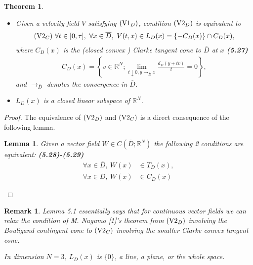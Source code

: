 \documentclass{book}
\numberwithin{equation}{section}
\newtheorem{lemma}{Lemma}[section]
\newtheorem{theorem}{Theorem}[section]
\newtheorem{remark}{Remark}[section]
\begin{document}
\begin{enumerate}
    \begin{theorem}
        \begin{itemize}
            \item[(i)] Given a velocity field $V$ satisfying $({\rm V1}_D)$, condition $({\rm V2}_D)$ is equivalent to
            \begin{align*}
                ({\rm V2}_C)\ \forall t\in[0,\tau],\ \forall x\in\overline{D},\ V(t,x)\in L_D(x) = \{-C_D(x)\}\cap C_D(x),
            \end{align*}
            where $C_D(x)$ is the (closed convex ) Clarke tangent cone to $\overline{D}$ at $x$ \textbf{(5.27)}
            \begin{align*}
                C_D(x) = \left\{v\in\mathbb{R}^N;\lim_{t\downarrow 0,y\to_{\overline{D}} x} \frac{d_D(y + tv)}{t} = 0\right\},
            \end{align*}
            and $\to_{\overline{D}}$ denotes the convergence in $\overline{D}$.
            \item[(ii)] $L_D(x)$ is a closed linear subspace of $\mathbb{R}^N$.
        \end{itemize}
    \end{theorem}
    
    \begin{proof}        
        The equivalence of $({\rm V2}_D)$ and $({\rm V2}_C)$ is a direct consequence of the following lemma.
        
        \begin{lemma}
            Given a vector field $W\in C(\overline{D};\mathbb{R}^N)$ the following 2 conditions are equivalent: \textbf{(5.28)-(5.29)}
            \begin{align*}
                \forall x\in\overline{D},\ W(x)&\in T_D(x),\\
                \forall x\in\overline{D},\ W(x)&\in C_D(x)
            \end{align*}
        \end{lemma}
    \end{proof}
    
    \begin{remark}
        Lemma 5.1 essentially says that for continuous vector fields we can relax the condition of M. Nagumo [1]'s theorem from $({\rm V2}_D)$ involving the Bouligand contingent cone to $({\rm V2}_C)$ involving the smaller Clarke convex tangent cone.
        
        In dimension $N = 3$, $L_D(x)$ is $\{0\}$, a line, a plane, or the whole space.
    \end{remark}
    

\end{enumerate}
\end{document}

